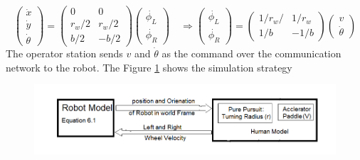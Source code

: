 \begin{equation}
\begin{pmatrix}
\dot{x}\\
\dot{y}\\
\dot{\theta}
\end{pmatrix}
=
\begin{pmatrix}
0 & 0 \\
r_w/2 & r_w/2 \\
b/2 & -b/2
\end{pmatrix}
\begin{pmatrix}
\dot{\phi_L}\\
\dot{\phi_R}
\end{pmatrix}
\quad \Rightarrow 
\begin{pmatrix}
\dot{\phi_L}\\
\dot{\phi_R}
\end{pmatrix} =
\begin{pmatrix}
1/r_w/ & 1/r_w \\
1/b & -1/b
\end{pmatrix}
\begin{pmatrix}
v\\
\dot{\theta}
\end{pmatrix}
\end{equation}
The operator station  sends $v$ and $\dot{\theta}$ as the command over the  communication network to the robot. The Figure \ref{fig:SimBlock} shows the simulation strategy 
\begin{figure}[h]
	\includegraphics[width=\linewidth,keepaspectratio]{Chapter6/fig/SimulationModel}
	\label{fig:SimBlock} 
\end{figure}
  


